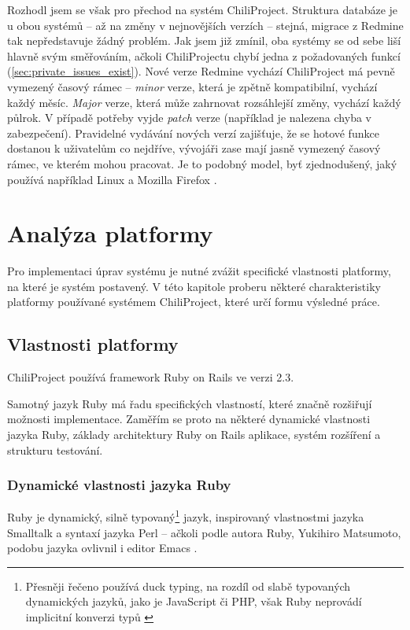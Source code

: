 \documentclass[thesis=B,czech]{FITthesis}[2012/05/02]
\begin{document}
Rozhodl jsem se však pro přechod na systém ChiliProject. Struktura databáze
je u obou systémů -- až na změny v nejnovějších verzích -- stejná,
migrace z Redmine tak nepředstavuje žádný problém. Jak jsem již zmínil,
oba systémy se od sebe liší hlavně svým směřováním, ačkoli
ChiliProjectu chybí jedna z požadovaných funkcí
(\autoref{sec:private_issues_exist}). Nové verze Redmine vychází
 ChiliProject má pevně vymezený časový rámec
-- \emph{minor} verze, která je zpětně kompatibilní,
vychází každý měsíc. \emph{Major} verze, která může zahrnovat rozsáhlejší změny,
vychází každý půlrok. V případě potřeby vyjde \emph{patch} verze (například je nalezena chyba v zabezpečení).
Pravidelné vydávání nových verzí zajišťuje, že se hotové funkce dostanou
k uživatelům co nejdříve, vývojáři zase mají jasně vymezený časový
rámec, ve kterém mohou pracovat. Je to podobný model, byť zjednodušený,
jaký používá například Linux a Mozilla Firefox
\citep{MozillaDevProcess}.

\chapter{Analýza platformy}
\label{chap:analyza_navrh}

Pro implementaci úprav systému je nutné zvážit specifické vlastnosti
platformy, na které je systém postavený. V této kapitole proberu některé
charakteristiky platformy používané systémem ChiliProject, které určí
formu výsledné práce.

\section{Vlastnosti platformy}

ChiliProject používá framework Ruby on Rails ve verzi 2.3.

Samotný jazyk Ruby má řadu specifických vlastností, které značně
rozšiřují možnosti implementace. Zaměřím se proto na některé dynamické
vlastnosti jazyka Ruby, základy architektury Ruby on Rails aplikace,
systém rozšíření a strukturu testování.

\subsection{Dynamické vlastnosti jazyka Ruby}
\label{sec:vlastnosti-ruby}

Ruby je dynamický, silně typovaný\footnote{Přesněji řečeno používá
  \gls{duck typing}, na rozdíl od slabě typovaných dynamických jazyků,
  jako je JavaScript či PHP, však Ruby neprovádí implicitní konverzi typů
  \citep{Lamontagne2007}} jazyk, inspirovaný vlastnostmi jazyka
Smalltalk a syntaxí jazyka Perl \citep{Stewart2001} -- ačkoli podle
autora Ruby, Yukihiro  Matsumoto, podobu jazyka ovlivnil i editor
Emacs \citep{Matsumoto2012}.
\end{document}
